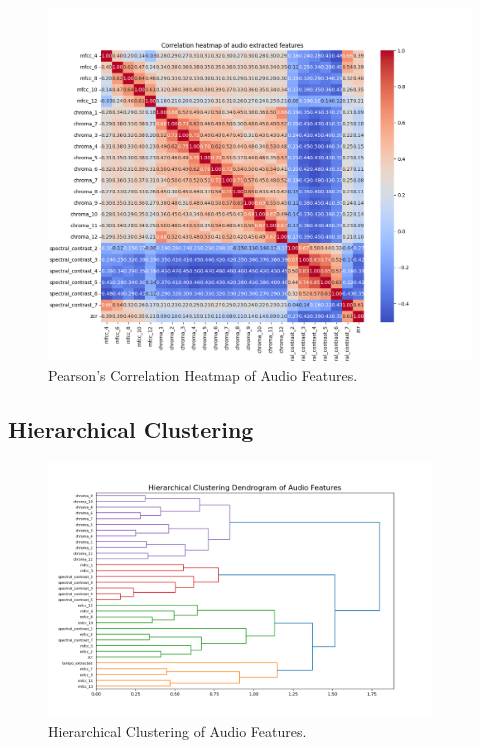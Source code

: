 \begin{center}
\begin{figure}[H]
  \centering
  \includegraphics[width=5in]{img/corr_heatmap_audio.png}
  \caption{Pearson's Correlation Heatmap of Audio Features.}
  \label{Figure:fig_beh}
\end{figure}
\end{center}

\subsection*{Hierarchical Clustering}
\label{sec:hierarchicalclustering}

\begin{center}
\begin{figure}[H]
  \centering
  \includegraphics[width=4in]{img/dendrogram_audio.png}
  \caption{Hierarchical Clustering of Audio Features.}
  \label{Figure:dendrogram_spotify_features}
\end{figure}
\end{center}


